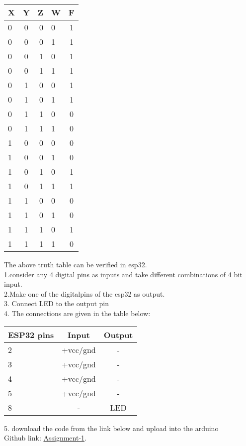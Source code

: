 \documentclass[10pt,a4paper]{report}
\begin{document}
\begin{multicols}{2}
  \begin{center}
    \label{tab:truthtable}
    \setlength{\arrayrulewidth}{0.5mm}
\setlength{\tabcolsep}{18pt}
\renewcommand{\arraystretch}{1.5}
    \begin{tabular}{|l|c|r|l|c|}
    \hline %
      \textbf{X} & \textbf{Y} & \textbf{Z} & \textbf{W} & \textbf{F}\\
      \hline
      0 & 0 & 0 & 0 & 1\\
      0 & 0 & 0 & 1 & 1\\
      0 & 0 & 1 & 0 & 1\\
      0 & 0 & 1 & 1 & 1\\
      0 & 1 & 0 & 0 & 1\\
      0 & 1 & 0 & 1 & 1\\
      0 & 1 & 1 & 0 & 0\\
      0 & 1 & 1 & 1 & 0\\
      1 & 0 & 0 & 0 & 0\\
      1 & 0 & 0 & 1 & 0\\
      1 & 0 & 1 & 0 & 1\\
      1 & 0 & 1 & 1 & 1\\
      1 & 1 & 0 & 0 & 0\\
      1 & 1 & 0 & 1 & 0\\
      1 & 1 & 1 & 0 & 1\\
      1 & 1 & 1 & 1 & 0\\
      \hline
      
    \end{tabular}
  \end{center}

 
 \raggedright The above truth table can be verified in esp32.\\1.consider any 4 digital pins as inputs and take different combinations of 4 bit input.\\2.Make one of the digitalpins of the esp32 as output.\\3. Connect LED to the output pin \\4. The connections are given in the table below:

 \begin{center}
 \setlength{\arrayrulewidth}{0.5mm}
\setlength{\tabcolsep}{15pt}
\renewcommand{\arraystretch}{1.5}
    \begin{tabular}{|l|c|c|}
    \hline 
    \textbf{ESP32 pins} & \textbf{Input} & \textbf{Output} \\
    \hline
    2 & +vcc/gnd & -\\
    3 & +vcc/gnd & -\\
    4 & +vcc/gnd & -\\
    5 & +vcc/gnd & -\\
    8 & - & LED\\
    \hline
      \end{tabular}
  \end{center}
\raggedright 5. download the code from the link below and upload into the arduino\\
Github link: \href{https://github.com/lakshmikamakshi/FWC/tree/main/assignment_1/codes}{Assignment-1}.



  \end{multicols}
\end{document}
